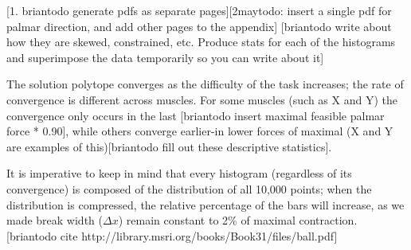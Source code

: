 [1. briantodo generate pdfs as separate pages][2maytodo: insert a single pdf for palmar direction, and add other pages to the appendix]
[briantodo write about how they are skewed, constrained, etc. Produce stats for each of the histograms and superimpose the data temporarily so you can write about it]

The solution polytope converges as the difficulty of the task increases; the rate of convergence is different across muscles. For some muscles (such as X and Y) the convergence only occurs in the last [briantodo insert maximal feasible palmar force * 0.90], while others converge earlier-in lower forces of maximal (X and Y are examples of this)[briantodo fill out these descriptive statistics].

It is imperative to keep in mind that every histogram (regardless of its convergence) is composed of the distribution of all 10,000 points; when the distribution is compressed, the relative percentage of the bars will increase, as we made break width ($\Delta x$) remain constant to 2\% of maximal contraction. [briantodo cite http://library.msri.org/books/Book31/files/ball.pdf]

